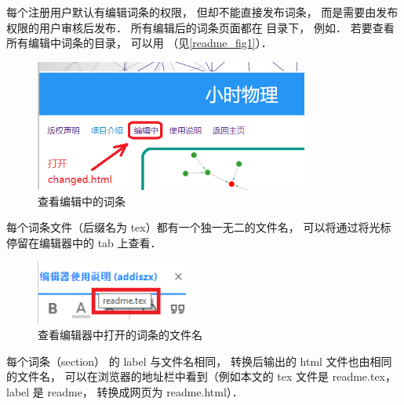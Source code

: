 每个注册用户默认有编辑词条的权限， 但却不能直接发布词条， 而是需要由发布权限的用户审核后发布． 所有编辑后的词条页面都在  目录下， 例如． 若要查看所有编辑中词条的目录， 可以用 （见\autoref{readme_fig1}）．

\begin{figure}[ht]
\centering
\includegraphics[width=9cm]{./figures/readme1.png}
\caption{查看编辑中的词条} \label{readme_fig1}
\end{figure}

每个词条文件（后缀名为 tex）都有一个独一无二的文件名， 可以将通过将光标停留在编辑器中的 tab 上查看．

\begin{figure}[ht]
\centering
\includegraphics[width=5cm]{./figures/readme2.png}
\caption{查看编辑器中打开的词条的文件名} \label{readme_fig2}
\end{figure}

每个词条（section） 的 label 与文件名相同， 转换后输出的 html 文件也由相同的文件名， 可以在浏览器的地址栏中看到（例如本文的 tex 文件是 readme.tex， label 是 readme， 转换成网页为 readme.html）．

